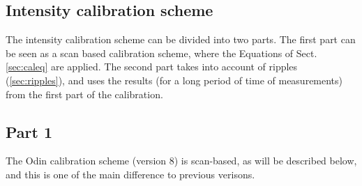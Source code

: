 \subsection{Intensity calibration scheme} 
\label{sec:calscheme}

The intensity calibration scheme can be divided into two parts. The first part can be
seen as a scan based calibration scheme, where the Equations of Sect.\ref{sec:caleq} are applied.
The second part takes into account of ripples (\ref{sec:ripples}), and uses the results
(for a long period of time of measurements) from the first part of the calibration.


\subsection*{Part 1}

The Odin calibration scheme (version 8) is scan-based, as will be described below, and
this is one of the main difference to previous verisons. 

